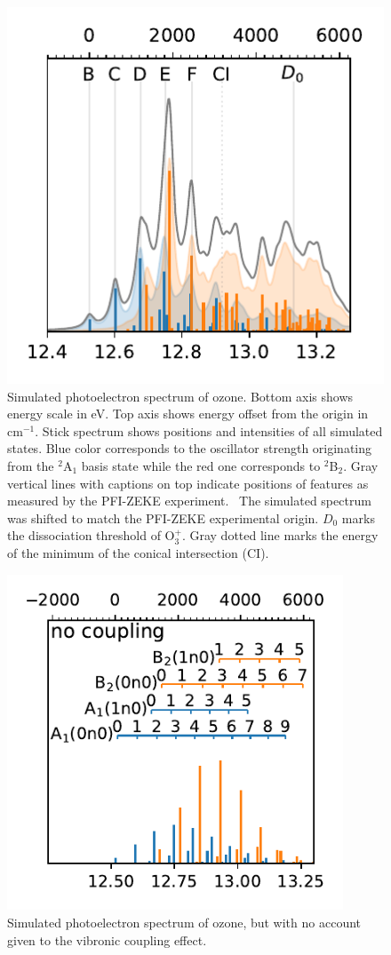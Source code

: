 \documentclass[
12pt,
a4paper,
prb,
superscriptaddress,
tightenlines,  %
]{revtex4}
\begin{document}
\begin{figure}
    \includegraphics[width=10 cm]{figures/spectrum_overline}
    \caption{
        Simulated photoelectron spectrum of ozone. Bottom axis shows energy
        scale in eV. Top axis shows energy offset from the origin in
        cm$^{-1}$. Stick spectrum shows positions and intensities of all
        simulated states. Blue color corresponds to the oscillator strength
        originating from the $^2$A$_1$ basis state while the red one
        corresponds to $^2$B$_2$. Gray vertical lines with captions on top
        indicate positions of features as measured by the PFI-ZEKE
        experiment.~\cite{Willitsch:O3ZEKE:2005} The simulated spectrum was
        shifted to match the PFI-ZEKE experimental origin. $D_0$ marks the
        dissociation threshold of O$_3^+$. Gray dotted line marks the energy
        of the minimum of the conical intersection (CI).
    }
    \label{fig:ozone_overlay}
\end{figure}


\begin{figure}
    \includegraphics[width=10cm]{figures/spectrum_assigned.pdf}
    \caption{
        Simulated photoelectron spectrum of ozone, but with no account given
        to the vibronic coupling effect.
    }
    \label{fig:no_coupling}
\end{figure}
\end{document}

